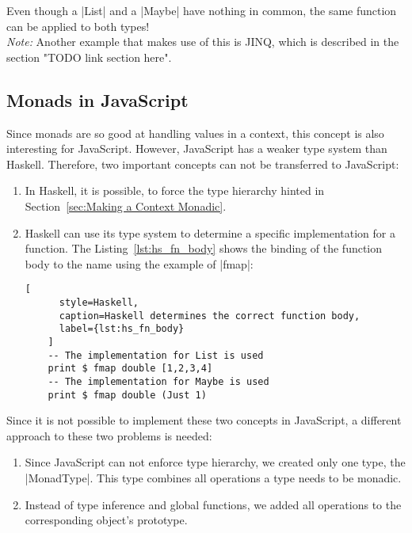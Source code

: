 Even though a |List| and a |Maybe| have nothing in common, the same function
can be applied to both types! \\ 
\textit{Note:} Another example that makes use of this is JINQ, which is described in the
section "TODO link section here".


\subsection{Monads in JavaScript} %
\label{sub:Monads in JavaScript}
Since monads are so good at handling values in a context, this concept is also
interesting for JavaScript. However, JavaScript has a weaker type system than
Haskell. Therefore, two important concepts can not be transferred to
JavaScript: 
\begin{enumerate}
  \item In Haskell, it is possible, to force the type hierarchy hinted in
    Section~\ref{sec:Making a Context Monadic}.
  \item Haskell can use its type system to determine a specific implementation
    for a function. The Listing~\ref{lst:hs_fn_body} shows the binding of the
    function body to the name using the example of |fmap|:
    \begin{lstlisting}[
      style=Haskell,
      caption=Haskell determines the correct function body,
      label={lst:hs_fn_body}
    ]
    -- The implementation for List is used
    print $ fmap double [1,2,3,4]
    -- The implementation for Maybe is used
    print $ fmap double (Just 1)
    \end{lstlisting}
\end{enumerate}


Since it is not possible to implement these two concepts in JavaScript, a
different approach to these two problems is needed:
\begin{enumerate}
  \item Since JavaScript can not enforce type hierarchy, we created only one
    type, the |MonadType|. This type combines all operations a type needs to be
    monadic.
  \item Instead of type inference and global functions, we added all operations
    to the corresponding object's prototype.
\end{enumerate}

